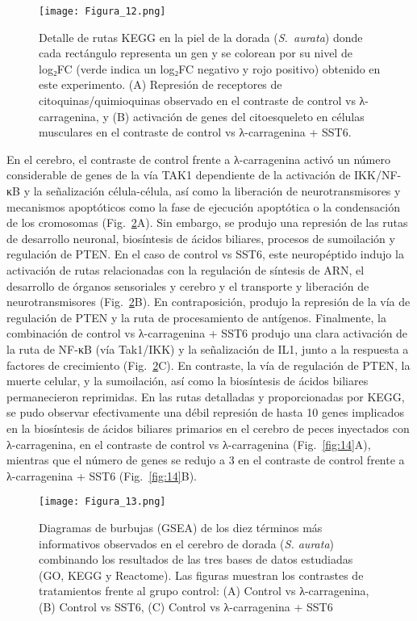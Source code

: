 \documentclass[10pt,a4paper]{article}
\begin{document}
\begin{figure}[htbp]
  \centering
 \texttt{[image: Figura\_12.png]}
 
  \caption{Detalle de rutas KEGG en la piel de la dorada (\textit{S.\ aurata}) donde cada rectángulo representa un gen y se colorean por su nivel de log₂FC (verde indica un log₂FC negativo y rojo positivo) obtenido en este experimento. (A) Represión de receptores de citoquinas/quimioquinas observado en el contraste de control vs λ-carragenina, y (B) activación de genes del citoesqueleto en células musculares en el contraste de control vs λ-carragenina + SST6.}
  \label{fig:12}
\end{figure}

En el cerebro, el contraste de control frente a λ-carragenina activó un número considerable de genes de la vía TAK1 dependiente de la activación de IKK/NF-κB y la señalización célula-célula, así como la liberación de neurotransmisores y mecanismos apoptóticos como la fase de ejecución apoptótica o la condensación de los cromosomas (Fig.~\ref{fig:13}A). Sin embargo, se produjo una represión de las rutas de desarrollo neuronal, biosíntesis de ácidos biliares, procesos de sumoilación y regulación de PTEN. En el caso de control vs SST6, este neuropéptido indujo la activación de rutas relacionadas con la regulación de síntesis de ARN, el desarrollo de órganos sensoriales y cerebro y el transporte y liberación de neurotransmisores (Fig.~\ref{fig:13}B). En contraposición, produjo la represión de la vía de regulación de PTEN y la ruta de procesamiento de antígenos. Finalmente, la combinación de control vs λ-carragenina + SST6 produjo una clara activación de la ruta de NF-κB (vía Tak1/IKK) y la señalización de IL1, junto a la respuesta a factores de crecimiento (Fig.~\ref{fig:13}C). En contraste, la vía de regulación de PTEN, la muerte celular, y la sumoilación, así como la biosíntesis de ácidos biliares permanecieron reprimidas. En las rutas detalladas y proporcionadas por KEGG, se pudo observar efectivamente una débil represión de hasta 10 genes implicados en la biosíntesis de ácidos biliares primarios en el cerebro de peces inyectados con λ-carragenina, en el contraste de control vs λ-carragenina (Fig.~\ref{fig:14}A), mientras que el número de genes se redujo a 3 en el contraste de control frente a λ-carragenina + SST6 (Fig.~\ref{fig:14}B).

\begin{figure}[p]                 %
  \centering
  \texttt{[image: Figura\_13.png]}
  \caption{Diagramas de burbujas (GSEA) de los diez términos más informativos observados en el cerebro de dorada (\textit{S. aurata}) combinando los resultados de las tres bases de datos estudiadas (GO, KEGG y Reactome). Las figuras muestran los contrastes de tratamientos frente al grupo control: (A) Control vs λ-carragenina,  (B) Control vs SST6, (C) Control vs λ-carragenina + SST6}

  \label{fig:13}
\end{figure}
\clearpage                          %
\end{document}
